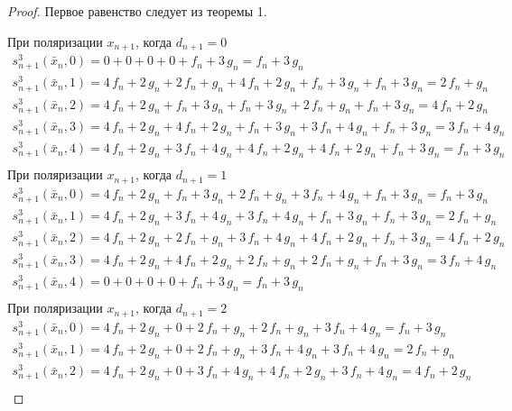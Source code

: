\documentclass[bibliography=totoc, a4paper, 14pt]{extarticle}
\begin{document}
 \begin{proof}

Первое равенство следует из теоремы 1.

При поляризации $x_{n+1}$, когда $d_{n+1} = 0$
$$\begin{array}{l}
s_{n+1}^3(\bar{x}_n, 0) = 0 + 0 + 0 + 0 + f_n + 3\,g_n = f_n + 3\,g_n \\
s_{n+1}^3(\bar{x}_n, 1) = 4\,f_n + 2\,g_n + 2\,f_n + g_n + 4\,f_n + 2\,g_n + f_n + 3\,g_n + f_n + 3\,g_n = 2\,f_n + g_n \\
s_{n+1}^3(\bar{x}_n, 2) = 4\,f_n + 2\,g_n + f_n + 3\,g_n + f_n + 3\,g_n + 2\,f_n + g_n + f_n + 3\,g_n = 4\,f_n + 2\,g_n \\
s_{n+1}^3(\bar{x}_n, 3) = 4\,f_n + 2\,g_n + 4\,f_n + 2\,g_n + f_n + 3\,g_n + 3\,f_n + 4\,g_n + f_n + 3\,g_n = 3\,f_n + 4\,g_n \\
s_{n+1}^3(\bar{x}_n, 4) = 4\,f_n + 2\,g_n + 3\,f_n + 4\,g_n + 4\,f_n + 2\,g_n + 4\,f_n + 2\,g_n + f_n + 3\,g_n = f_n + 3\,g_n \\
\end{array}$$
При поляризации $x_{n+1}$, когда $d_{n+1} = 1$
$$\begin{array}{l}
s_{n+1}^3(\bar{x}_n, 0) = 4\,f_n + 2\,g_n + f_n + 3\,g_n + 2\,f_n + g_n + 3\,f_n + 4\,g_n + f_n + 3\,g_n = f_n + 3\,g_n \\
s_{n+1}^3(\bar{x}_n, 1) = 4\,f_n + 2\,g_n + 3\,f_n + 4\,g_n + 3\,f_n + 4\,g_n + f_n + 3\,g_n + f_n + 3\,g_n = 2\,f_n + g_n \\
s_{n+1}^3(\bar{x}_n, 2) = 4\,f_n + 2\,g_n + 2\,f_n + g_n + 3\,f_n + 4\,g_n + 4\,f_n + 2\,g_n + f_n + 3\,g_n = 4\,f_n + 2\,g_n \\
s_{n+1}^3(\bar{x}_n, 3) = 4\,f_n + 2\,g_n + 4\,f_n + 2\,g_n + 2\,f_n + g_n + 2\,f_n + g_n + f_n + 3\,g_n = 3\,f_n + 4\,g_n \\
s_{n+1}^3(\bar{x}_n, 4) = 0 + 0 + 0 + 0 + f_n + 3\,g_n = f_n + 3\,g_n \\
\end{array}$$
При поляризации $x_{n+1}$, когда $d_{n+1} = 2$
$$\begin{array}{l}
s_{n+1}^3(\bar{x}_n, 0) = 4\,f_n + 2\,g_n + 0 + 2\,f_n + g_n + 2\,f_n + g_n + 3\,f_n + 4\,g_n = f_n + 3\,g_n \\
s_{n+1}^3(\bar{x}_n, 1) = 4\,f_n + 2\,g_n + 0 + 2\,f_n + g_n + 3\,f_n + 4\,g_n + 3\,f_n + 4\,g_n = 2\,f_n + g_n \\
s_{n+1}^3(\bar{x}_n, 2) = 4\,f_n + 2\,g_n + 0 + 3\,f_n + 4\,g_n + 4\,f_n + 2\,g_n + 3\,f_n + 4\,g_n = 4\,f_n + 2\,g_n \\

\end{array}$$
\end{proof}
\end{document}
